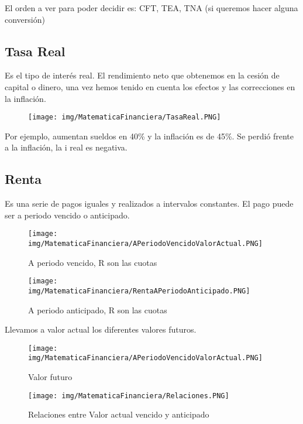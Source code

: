 \documentclass[titlepage,a4paper]{article}
\begin{document}
El orden a ver para poder decidir es: CFT, TEA, TNA (si queremos hacer alguna conversión)

\newpage
\subsection{Tasa Real}
Es el tipo de interés real. El rendimiento neto que obtenemos en la cesión de capital o dinero, una vez hemos tenido en cuenta los efectos y las correcciones en la inflación.

\begin{figure}[!htb]
    \centering
    \texttt{[image: img/MatematicaFinanciera/TasaReal.PNG]}
\end{figure}

Por ejemplo, aumentan sueldos en 40\% y la inflación es de 45\%. Se perdió frente a la inflación, la i real es negativa.

\newpage
\subsection{Renta}
Es una serie de pagos iguales y realizados a intervalos constantes. El pago puede ser a periodo vencido o anticipado. 

\begin{figure}[!htb]
    \centering
    \texttt{[image: img/MatematicaFinanciera/APeriodoVencidoValorActual.PNG]}
    \caption{A periodo vencido, R son las cuotas}
\end{figure}

\begin{figure}[!htb]
    \centering
    \texttt{[image: img/MatematicaFinanciera/RentaAPeriodoAnticipado.PNG]}
    \caption{A periodo anticipado, R son las cuotas}
\end{figure}

Llevamos a valor actual los diferentes valores futuros.

\begin{figure}[!htb]
    \centering
    \texttt{[image: img/MatematicaFinanciera/APeriodoVencidoValorActual.PNG]}
    \caption{Valor futuro}
\end{figure}

\begin{figure}[!htb]
    \centering
    \texttt{[image: img/MatematicaFinanciera/Relaciones.PNG]}
    \caption{Relaciones entre Valor actual vencido y anticipado}
\end{figure}
\end{document}
